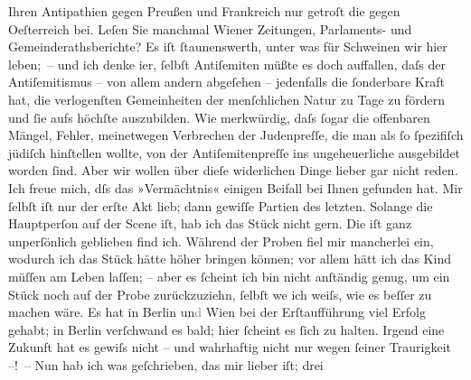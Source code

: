 \begin{ledgroupsized}[t]{13cm}
               Ihren Antipathien gegen Preußen und Frankreich nur getroſt \introOben{}die\introOben{} gegen Oeſterreich bei. Leſen Sie manchmal Wiener Zeitungen, Parlaments- und
               Gemeinderathsberichte? Es iſt ſtaunenswerth, unter was für Schweinen wir hier
               leben; – und {\pb}ich denke i{\geminationm}er, ſelbſt Antiſemiten müßte es doch auffallen, daſs
               der Antiſemitismus – von allem andern abgeſehen – jedenfalls die ſonderbare Kraft
               hat, die verlogenſten Gemeinheiten der menſchlichen Natur zu Tage zu fördern und ſie
               aufs höchſte auszubilden. Wie merkwürdig, daſs ſogar die offenbaren Mängel, Fehler,
               meinetwegen Verbrechen der Judenpreſſe, die man als ſo ſpezifiſch jüdiſch hinſtellen
               wollte, von der Antiſemiten{\pb}preſſe ins
               ungeheuerliche ausgebildet worden ſind. Aber wir wollen über dieſe widerlichen Dinge
               lieber gar nicht reden.\pend
           \pstart
           Ich freue mich, dſs das »Vermächtnis« einigen
               Beifall bei Ihnen gefunden hat. Mir ſelbſt iſt nur der erſte Akt lieb; dann gewiſſe
               Partien des letzten. Solange die Hauptperſon auf der Scene iſt, hab ich das Stück
               nicht gern. Die iſt ganz unperſönlich geblieben find ich. Während der Proben fiel mir
               mancherlei ein, wodurch ich das Stück hätte höher bringen können; vor allem hätt ich
               das Kind {\pb}müſſen am Leben laſſen; – aber es
               ſcheint ich bin nicht anſtändig genug, um ein Stück noch auf der Probe zurückzuziehn,
               ſelbſt we{\geminationn} ich weiſs, wie es beſſer zu machen wäre. Es
               hat in Berlin un\textcolor{gray}{d}{ }Wien bei der Erſtaufführung viel Erfolg gehabt; in
                  Berlin verſchwand es bald; hier ſcheint es
               ſich zu halten. Irgend eine Zukunft hat es gewiſs nicht – und wahrhaftig nicht nur
               wegen ſeiner Traurigkeit –! – Nun hab ich was geſchrieben, das mir lieber iſt; drei

\end{ledgroupsized}

